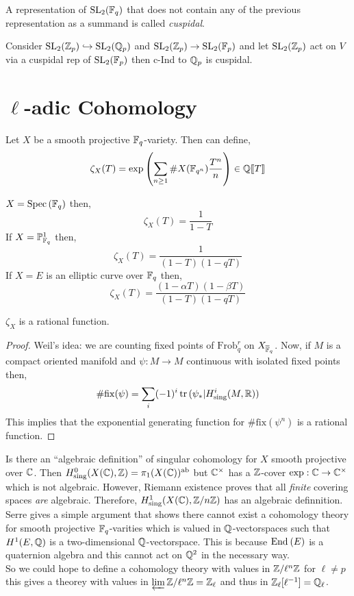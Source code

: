 \documentclass[12pt]{article}
\newcommand{\Frob}{\mathrm{Frob}}
\begin{document}
\begin{defn}
A representation of $\mathrm{SL}_2(\mathbb{F}_q)$ that does not contain any of the previous representation as a summand is called \textit{cuspidal}. 
\end{defn}

\begin{example}
Consider $\mathrm{SL}_2(\mathbb{Z}_p) \hookrightarrow \mathrm{SL}_2(\mathbb{Q}_p)$ and $\mathrm{SL}_2(\mathbb{Z}_p) \to \mathrm{SL}_2(\mathbb{F}_p)$ and let $\mathrm{SL}_2(\mathbb{Z}_p)$ act on $V$ via a cuspidal rep of $\mathrm{SL}_2(\mathbb{F}_p)$ then c-Ind to $\mathbb{Q}_p$ is cuspidal. 
\end{example}

\section{$\ell$-adic Cohomology}

Let $X$ be a smooth projective $\mathbb{F}_q$-variety. Then can define,
\[ \zeta_X(T) = \exp{ \left( \sum_{n \ge 1} \# X(\mathbb{F}_{q^n}) \frac{T^n}{n} \right)} \in \mathbb{Q}\llbracket T \rrbracket \]
 
\begin{example}
$X = \mathrm{Spec}\left( \mathbb{F}_q \right)$ then, 
\[ \zeta_X(T) = \frac{1}{1 - T} \]
If $X = \mathbb{P}^1_{\mathbb{F}_q}$ then,
\[ \zeta_X(T) = \frac{1}{(1 - T)(1 - q T)} \]
If $X = E$ is an elliptic curve over $\mathbb{F}_q$ then,
\[ \zeta_X(T) = \frac{(1 - \alpha T)(1 - \beta T)}{(1 - T)(1 - q T)} \]
\end{example}

\begin{conj}[Weil]
$\zeta_X$ is a rational function. 
\end{conj}

\begin{proof}
Weil's idea: we are counting fixed points of $\Frob^r_q$ on $X_{\overline{\mathbb{F}}_q}$. Now, if $M$ is a compact oriented manifold and $\psi : M \to M$ continuous with isolated fixed points then,
\[ \# \mathrm{fix}(\psi) = \sum_{i} (-1)^i \operatorname{\mathrm{tr}}{( \psi_* | H^i_{\text{sing}}(M, \mathbb{R}))} \]
This implies that the exponential generating function for $\# \mathrm{fix}(\psi^n)$ is a rational function. 
\end{proof}

Is there an ``algebraic definition'' of singular cohomology for $X$ smooth projective over $\mathbb{C}$. Then $H^0_{\text{sing}}(X(\mathbb{C}), \mathbb{Z}) = \pi_1(X(\mathbb{C}))^{\mathrm{ab}}$ but $\mathbb{C}^\times$ has a $\mathbb{Z}$-cover $\exp : \mathbb{C} \to \mathbb{C}^\times$ which is not algebraic. However, Riemann existence proves that all \textit{finite} covering spaces \textit{are} algebraic. Therefore, $H^1_{\text{sing}}(X(\mathbb{C}), \mathbb{Z} / n \mathbb{Z})$ has an algebraic definnition. 
\bigskip\\
Serre gives a simple argument that shows there cannot exist a cohomology theory for smooth projective $\mathbb{F}_q$-varities which is valued in $\mathbb{Q}$-vectorspaces such that $H^1(E, \mathbb{Q})$ is a two-dimensional $\mathbb{Q}$-vectorspace. This is because $\mathrm{End}_{} \left( E \right)$ is a quaternion algebra and this cannot act on $\mathbb{Q}^2$ in the necessary way. 
\bigskip\\
So we could hope to define a cohomology theory with values in $\mathbb{Z} / \ell^n \mathbb{Z}$ for $\ell \neq p$ this gives a theorey with values in $\varprojlim \mathbb{Z} / \ell^n \mathbb{Z} = \mathbb{Z}_\ell$ and thus in $\mathbb{Z}_\ell[\ell^{-1}] = \mathbb{Q}_\ell$.
\end{document}
